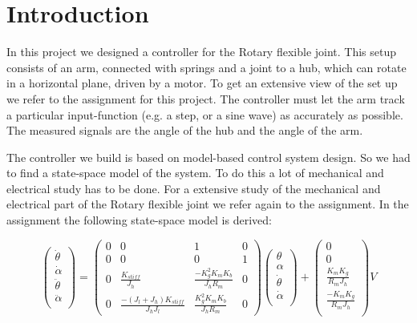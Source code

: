 \documentclass[ twoside,openright,titlepage,numbers=noenddot,headinclude,%
                footinclude=true,cleardoublepage=empty,abstractoff, %
                BCOR=5mm,paper=a4,fontsize=11pt,%
                ngerman,american,%
                ]{scrreprt}
\begin{document}
\frenchspacing
\raggedbottom
{} %
\pagestyle{plain}


\pagestyle{scrheadings}



\chapter{Introduction}
In this project we designed a controller for the Rotary flexible joint. This setup consists of an arm, connected with springs and a joint to a hub, which can rotate in a horizontal plane, driven by a motor. To get an extensive view of the set up we refer to the assignment for this project. The controller must let the arm track a particular input-function (e.g. a step, or a sine wave) as accurately as possible. The measured signals are the angle of the hub and the angle of the arm.

The controller we build is based on model-based control system design. So we had to find a state-space model of the system. To do this a lot of mechanical and electrical study has to be done. For a extensive study of the mechanical and electrical part of the Rotary flexible joint we refer again to the assignment. In the assignment the following state-space model is derived: 

\begin{equation}
\begin{pmatrix}
\dot{\theta} \\
\dot{\alpha} \\
\ddot{\theta} \\
\ddot{\alpha} \\
\end{pmatrix}
= \begin{pmatrix}
  0 & 0 & 1 & 0 \\
  0 & 0 & 0 & 1 \\
  0  & \frac{K_{stiff}}{J_h}  & \frac{-K_g^2 K_m K_b}{J_h R_m} & 0 \\
  0 & \frac{-(J_l + J_h)K_{stiff}}{J_h J_l} & \frac{K_g^2 K_m K_b}{J_h R_m} & 0
\end{pmatrix}
\begin{pmatrix}
\theta \\
\alpha \\
\dot{\theta} \\
\dot{\alpha} \\
\end{pmatrix} + 
\begin{pmatrix}
0 \\
0 \\
\frac{K_m K_g}{R_m J_h} \\
\frac{-K_m K_g}{R_m J_h}  \\
\end{pmatrix} V
\end{equation}
\end{document}
